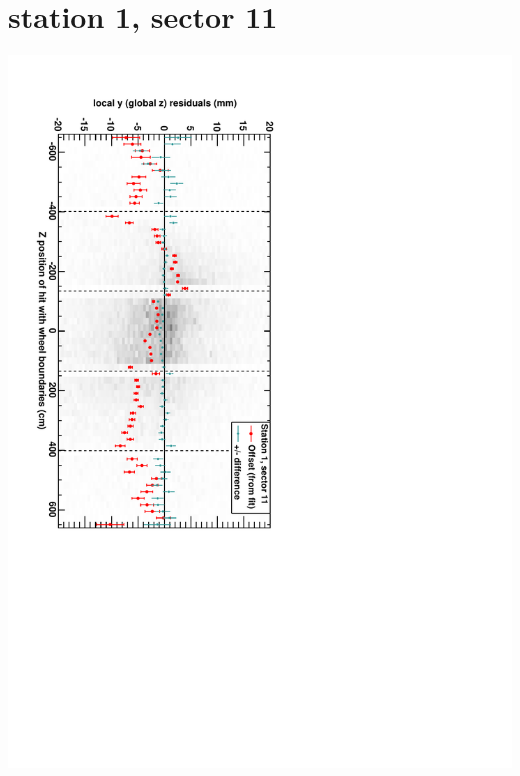 \documentclass[compress]{beamer}
\begin{document}
\section*{station 1, sector 11}
\begin{frame} \vfill \mbox{\hspace{-1 cm}\includegraphics[height=1.2\linewidth, angle=90]{DTzVsZ_st1_sr11.pdf}} \end{frame}
\end{document}
